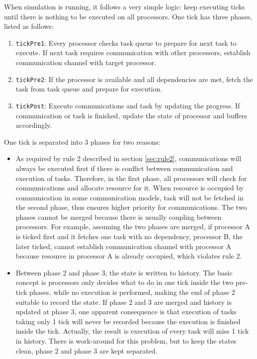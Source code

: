 \documentclass[msc,deptreport, cs]{infthesis}
\begin{document}
When simulation is running, it follows a very simple logic: keep executing ticks until there is nothing to be executed on all processors. One tick has three phases, listed as follows:

\begin{enumerate}
  \item \verb+tickPre1+: Every processor checks task queue to prepare for next task to execute. If next task requires communication with other processors, establish communication channel with target processor.
  \item \verb+tickPre2+: If the processor is available and all dependencies are met, fetch the task from task queue and prepare for execution.
  \item \verb+tickPost+: Execute communications and task by updating the progress. If communication or task is finished, update the state of processor and buffers accordingly.
\end{enumerate}

One tick is separated into 3 phases for two reasons:

\begin{itemize}
  \item As required by rule 2 described in section \ref{sec:rule2}, communications will always be executed first if there is conflict between communication and execution of tasks. Therefore, in the first phase, all processors will check for communications and allocate resource for it. When resource is occupied by communication in some communication models, task will not be fetched in the second phase, thus ensures higher priority for communications. The two phases cannot be merged because there is usually coupling between processors. For example, assuming the two phases are merged, if processor A is ticked first and it fetches one task with no dependency, processor B, the later ticked, cannot establish communication channel with processor A because resource in processor A is already occupied, which violates rule 2.
  \item Between phase 2 and phase 3, the state is written to history. The basic concept is processors only decides what to do in one tick inside the two pre-tick phases, while no execution is performed, making the end of phase 2 suitable to record the state. If phase 2 and 3 are merged and history is updated at phase 3, one apparent consequence is that execution of tasks taking only 1 tick will never be recorded because the execution is finished inside the tick. Actually, the result is execution of every task will miss 1 tick in history. There is work-around for this problem, but to keep the states clean, phase 2 and phase 3 are kept separated.
\end{itemize}
\end{document}
